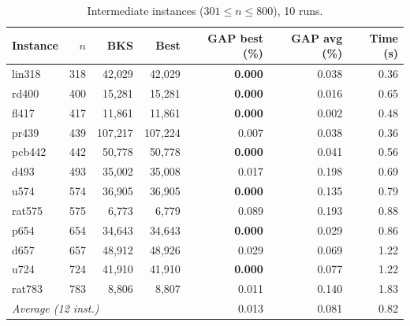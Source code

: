 \documentclass[runningheads]{llncs}
\begin{document}
\begin{table}
\caption{Intermediate instances ($301\le n\le 800$), 10 runs.}
\label{tab:inter}
\centering\scriptsize
\begin{tabular}{@{}lrrrrrr@{}}
\toprule
\textbf{Instance} & $n$ & \textbf{BKS} & \textbf{Best} & \textbf{GAP best (\%)} & \textbf{GAP avg (\%)} & \textbf{Time (s)}\\
\midrule
lin318 & 318 & 42{,}029 & 42{,}029 & \textbf{0.000} & 0.038 & 0.36 \\
rd400 & 400 & 15{,}281 & 15{,}281 & \textbf{0.000} & 0.016 & 0.65 \\
fl417 & 417 & 11{,}861 & 11{,}861 & \textbf{0.000} & 0.002 & 0.48 \\
pr439 & 439 & 107{,}217 & 107{,}224 & 0.007 & 0.038 & 0.36 \\
pcb442 & 442 & 50{,}778 & 50{,}778 & \textbf{0.000} & 0.041 & 0.56 \\
d493 & 493 & 35{,}002 & 35{,}008 & 0.017 & 0.198 & 0.69 \\
u574 & 574 & 36{,}905 & 36{,}905 & \textbf{0.000} & 0.135 & 0.79 \\
rat575 & 575 & 6{,}773 & 6{,}779 & 0.089 & 0.193 & 0.88 \\
p654 & 654 & 34{,}643 & 34{,}643 & \textbf{0.000} & 0.029 & 0.86 \\
d657 & 657 & 48{,}912 & 48{,}926 & 0.029 & 0.069 & 1.22 \\
u724 & 724 & 41{,}910 & 41{,}910 & \textbf{0.000} & 0.077 & 1.22 \\
rat783 & 783 & 8{,}806 & 8{,}807 & 0.011 & 0.140 & 1.83 \\
\midrule
\multicolumn{4}{l}{\textit{Average (12 inst.)}} & 0.013 & 0.081 & 0.82 \\
\bottomrule
\end{tabular}
\end{table}
\end{document}
